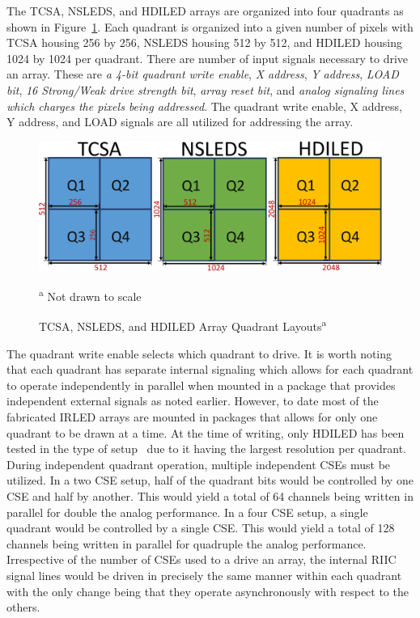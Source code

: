     The TCSA, NSLEDS, and HDILED arrays are organized into four quadrants as shown in Figure~\ref{fig:tcsa_nsleds_hdiled_quads}. Each quadrant is organized into a given number of pixels with TCSA housing 256 by 256, NSLEDS housing 512 by 512, and HDILED housing 1024 by 1024 per quadrant. There are number of input signals necessary to drive an array. These are {\em a 4-bit quadrant write enable}, {\em X address}, {\em Y address}, {\em LOAD bit}, {\em 16 Strong/Weak drive strength bit}, {\em array reset bit}, and {\em analog signaling lines which charges the pixels being addressed}. The quadrant write enable, X address, Y address, and LOAD signals are all utilized for addressing the array.

    \begin{figure}
        \centering
        \includegraphics[width=1.0\textwidth]{fig/tcsa_nsleds_hdiled_quads.pdf}
        \caption[TCSA, NSLEDS, and HDILED Array Quadrant Layouts]{TCSA, NSLEDS, and HDILED Array Quadrant Layouts\textsuperscript{a}}
        \vspace{0px}
        \footnotesize\textsuperscript{a} Not drawn to scale
        \label{fig:tcsa_nsleds_hdiled_quads}
    \end{figure}

    The quadrant write enable selects which quadrant to drive. It is worth noting that each quadrant has separate internal signaling which allows for each quadrant to operate independently in parallel when mounted in a package that provides independent external signals as noted earlier. However, to date most of the fabricated IRLED arrays are mounted in packages that allows for only one quadrant to be drawn at a time. At the time of writing, only HDILED has been tested in the type of setup~\cite{LassiterEtAl2019_0, LassiterEtAl2019_1, LassiterEtAl2019_2, LassiterEtAl2020} due to it having the largest resolution per quadrant. During independent quadrant operation, multiple independent CSEs must be utilized. In a two CSE setup, half of the quadrant bits would be controlled by one CSE and half by another. This would yield a total of 64 channels being written in parallel for double the analog performance. In a four CSE setup, a single quadrant would be controlled by a single CSE. This would yield a total of 128 channels being written in parallel for quadruple the analog performance. Irrespective of the number of CSEs used to a drive an array, the internal RIIC signal lines would be driven in precisely the same manner within each quadrant with the only change being that they operate asynchronously with respect to the others.

